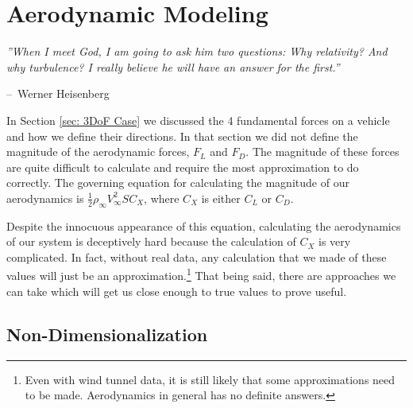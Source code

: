 \documentclass[12pt]{report}
\makeatletter
\newenvironment{chapquote}[2][2em]
  {\setlength{\@tempdima}{#1}%
   \def\chapquote@author{#2}%
   \parshape 1 \@tempdima \dimexpr\textwidth-2\@tempdima\relax%
   \itshape}
  {\par\normalfont\hfill--\ \chapquote@author\hspace*{\@tempdima}\par\bigskip}
\makeatother
\begin{document}
\chapter{Aerodynamic Modeling}\label{sec: aerodynamics}
\begin{chapquote}{Werner Heisenberg}
''When I meet God, I am going to ask him two questions: Why relativity? And why turbulence? I really believe he will have an answer for the first.''
\end{chapquote}
In Section \ref{sec: 3DoF Case} we discussed the 4 fundamental forces on a vehicle and how we define their directions. In that section we did not define the magnitude of the aerodynamic forces, $F_L$ and $F_D$. The magnitude of these forces are quite difficult to calculate and require the most approximation to do correctly. The governing equation for calculating the magnitude of our aerodynamics is $\frac{1}{2}\rho_{\infty}V^2_{\infty}SC_X$, where $C_X$ is either $C_L$ or $C_D$.

Despite the innocuous appearance of this equation, calculating the aerodynamics of our system is deceptively hard because the calculation of $C_X$ is very complicated. In fact, without real data, any calculation that we made of these values will just be an approximation.\footnote{Even with wind tunnel data, it is still likely that some approximations need to be made. Aerodynamics in general has no definite answers.} That being said, there are approaches we can take which will get us close enough to true values to prove useful.

\section{Non-Dimensionalization}
\end{document}
